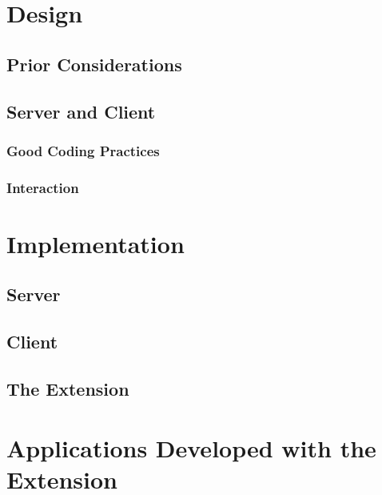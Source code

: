 \documentclass[bsc,frontabs,twoside,singlespacing,parskip,deptreport]{infthesis}     %
\begin{document}
\section{Design}
\subsection{Prior Considerations}
\subsection{Server and Client}
\subsubsection{Good Coding Practices}
\subsubsection{Interaction}

\section{Implementation}
\subsection{Server}
\subsection{Client}
\subsection{The Extension}
\section{Applications Developed with the Extension}
\end{document}
